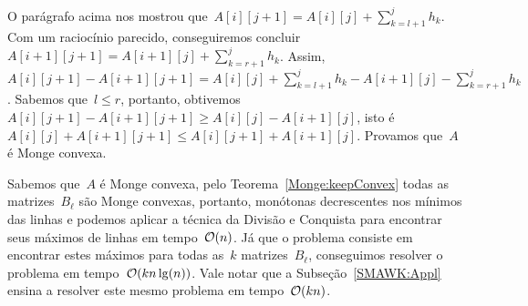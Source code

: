 O parágrafo acima nos mostrou que~$A[i][j+1] = {A[i][j] + \sum\limits_{k=l+1}^j h_k}$. Com um raciocínio parecido, conseguiremos concluir~${A[i+1][j+1]} = {A[i+1][j] + \sum\limits_{k=r+1}^j h_k}$. Assim,~$A[i][j+1] - A[i+1][j+1] = A[i][j] + \sum\limits_{k=l+1}^j h_k - A[i+1][j] - \sum\limits_{k=r+1}^j h_k$. Sabemos que~$l \leq r$, portanto, obtivemos~${A[i][j+1] - A[i+1][j+1] \geq A[i][j] - A[i+1][j]}$, isto é~${A[i][j] + A[i+1][j+1] \leq A[i][j+1] + A[i+1][j]}$. Provamos que~$A$ é Monge convexa.

Sabemos que~$A$ é Monge convexa, pelo Teorema~\ref{Monge:keepConvex} todas as matrizes~$B_\ell$ são Monge convexas, portanto, monótonas decrescentes nos mínimos das linhas e podemos aplicar a técnica da Divisão e Conquista para encontrar seus máximos de linhas em tempo~$\mathcal{O}(n)$. Já que o problema consiste em encontrar estes máximos para todas as~$k$ matrizes~$B_\ell$, conseguimos resolver o problema em tempo~$\mathcal{O}(kn\lg(n))$. Vale notar que a Subseção~\ref{SMAWK:Appl} ensina a resolver este mesmo problema em tempo~$\mathcal{O}(kn)$.
